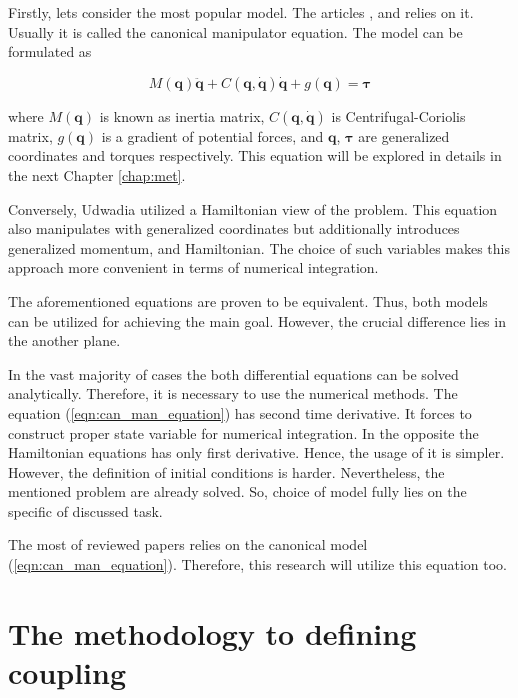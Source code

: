 Firstly, lets consider the most popular model. The articles 
\cite{UdwadiaKalabaApproach}, \cite{AppOfUdwadiaKalabaApproach} and 
\cite{UnifiedFrameworkOfRobotControl} relies on it. Usually it is 
called the canonical manipulator equation. The model can be formulated 
as 

\begin{equation} \label{eqn:can_man_equation}
    M(\mathbf{q})\ddot{\mathbf{q}} + 
    C(\mathbf{q}, \dot{\mathbf{q}}) \dot{\mathbf{q}} + 
    g(\mathbf{q}) = 
    \boldsymbol{\tau}
\end{equation}

where $M(\mathbf{q})$ is known as inertia matrix, $C(\mathbf{q}, \dot{\mathbf{q}})$ 
is Centrifugal-Coriolis matrix, $g(\mathbf{q})$ is a gradient
of potential forces, and $\mathbf{q}$, $\boldsymbol{\tau}$ are generalized 
coordinates and torques respectively. This equation will be explored in details 
in the next Chapter \ref{chap:met}.

Conversely, Udwadia \cite{ConstHamiltonSys} utilized a Hamiltonian view of the 
problem. This equation also manipulates with generalized coordinates but 
additionally introduces generalized momentum, and Hamiltonian. The choice of 
such variables makes this approach more convenient in terms of numerical 
integration.

The aforementioned equations are proven to be equivalent. Thus, both models 
can be utilized for achieving the main goal. However, the crucial difference 
lies in the another plane. 

In the vast majority of cases the both differential equations can be solved 
analytically. Therefore, it is necessary to use the numerical methods. The 
equation (\ref{eqn:can_man_equation}) has second time derivative. It forces 
to construct proper state variable for numerical integration. In the opposite 
the Hamiltonian equations has only first derivative. Hence, the usage of it is 
simpler. However, the definition of initial conditions is harder.
Nevertheless, the mentioned problem are already solved. So, choice of model 
fully lies on the specific of discussed task. 

The most of reviewed papers relies on the canonical model 
(\ref{eqn:can_man_equation}). Therefore, this research will utilize this equation 
too.

\section{The methodology to defining coupling} \label{sec:interaction_def}

